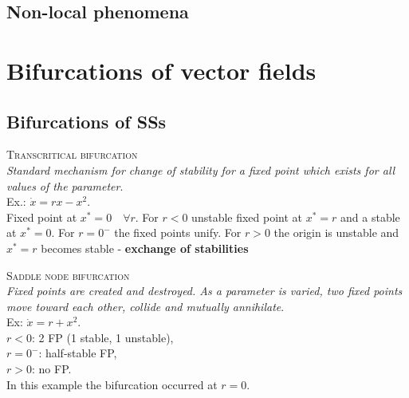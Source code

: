 \subsection{Non-local phenomena}
\section{Bifurcations of vector fields}
\subsection{Bifurcations of SSs}
\textsc{Transcritical bifurcation}\\
\emph{Standard mechanism for change of stability for a fixed point which exists for all values of the parameter}.\\
Ex.: $\dot{x}=rx-x^2$.\\
Fixed point at $x^*=0 \quad \forall r$. For $r<0$ unstable fixed point at $x^*=r$ and a stable at $x^*=0$. For $r=0^-$ the fixed points unify. For $r>0$ the origin is unstable and $x^*=r$ becomes stable - \textbf{exchange of stabilities}
\begin{center}
\end{center}
\vspace{0.2cm}


\textsc{Saddle node bifurcation}\\
\emph{Fixed points are created and destroyed. As a parameter is varied, two fixed points move toward each other, collide and mutually annihilate}.\\
Ex: $\dot{x}=r+x^2$.\\ $r<0$: 2 FP (1 stable, 1 unstable),\\ $r=0^-$: half-stable FP, \\ $r>0$: no FP.\\ In this example the bifurcation occurred at $r=0$.
\begin{center}
\end{center}
\vspace{0.2cm}

